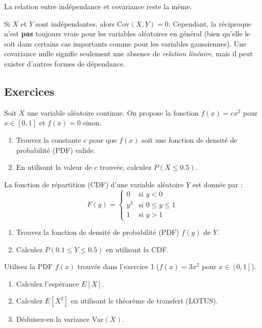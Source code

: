 La relation entre indépendance et covariance reste la même.

\begin{remarquebox}
Si $X$ et $Y$ sont indépendantes, alors $\text{Cov}(X, Y) = 0$. Cependant, la réciproque n'est \textbf{pas} toujours vraie pour les variables aléatoires en général (bien qu'elle le soit dans certains cas importants comme pour les variables gaussiennes). Une covariance nulle signifie seulement une absence de \textit{relation linéaire}, mais il peut exister d'autres formes de dépendance.
\end{remarquebox}

\subsection{Exercices}


\begin{exercicebox}
Soit $X$ une variable aléatoire continue. On propose la fonction $f(x) = c x^2$ pour $x \in [0, 1]$ et $f(x) = 0$ sinon.
\begin{enumerate}
    \item Trouvez la constante $c$ pour que $f(x)$ soit une fonction de densité de probabilité (PDF) valide.
    \item En utilisant la valeur de $c$ trouvée, calculez $P(X \le 0.5)$.
\end{enumerate}
\end{exercicebox}

\begin{exercicebox}
La fonction de répartition (CDF) d'une variable aléatoire $Y$ est donnée par :
$$ F(y) = \begin{cases} 0 & \text{si } y < 0 \\ y^3 & \text{si } 0 \le y \le 1 \\ 1 & \text{si } y > 1 \end{cases} $$
\begin{enumerate}
    \item Trouvez la fonction de densité de probabilité (PDF) $f(y)$ de $Y$.
    \item Calculez $P(0.1 \le Y \le 0.5)$ en utilisant la CDF.
\end{enumerate}
\end{exercicebox}

\begin{exercicebox}
Utilisez la PDF $f(x)$ trouvée dans l'exercice 1 ($f(x) = 3x^2$ pour $x \in [0, 1]$).
\begin{enumerate}
    \item Calculez l'espérance $E[X]$.
    \item Calculez $E[X^2]$ en utilisant le théorème de transfert (LOTUS).
    \item Déduisez-en la variance $\text{Var}(X)$.
\end{enumerate}
\end{exercicebox}

